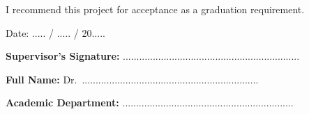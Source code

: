 \begin{english}
\vspace{0.7cm}

I recommend this project for acceptance as a graduation requirement.

\vspace{1cm}

Date: ..... / ..... / 20.....

\vspace{1.5cm}

\textbf{Supervisor's Signature:} .................................................................

\vspace{0.4cm}

\textbf{Full Name:} Dr.\ .................................................................

\vspace{0.4cm}

\textbf{Academic Department:} ...............................................................
\end{english}
